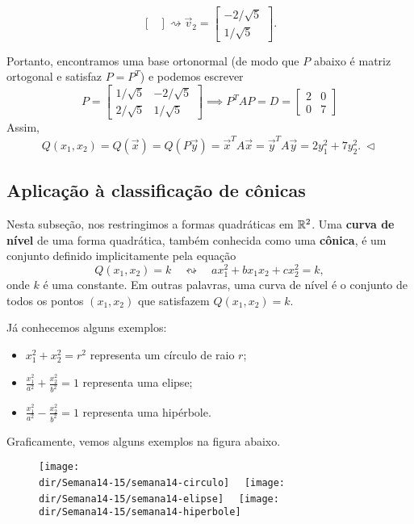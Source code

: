 \documentclass[../livro.tex]{subfiles}
\providecommand{\dir}{..}  %
\begin{document}
\begin{example}
\begin{itemize}
\[\begin{bmatrix}
		\end{bmatrix} \rightsquigarrow
		\vec{v}_2 = \begin{bmatrix}
		-2/\sqrt{5} \\ 1/\sqrt{5}
		\end{bmatrix} .
		\]
	\end{itemize}  Portanto, encontramos uma base ortonormal (de modo que $P$ abaixo é matriz ortogonal e satisfaz $P = P^T$) e podemos escrever
	\[
	P = 
	\begin{bmatrix}
	1/\sqrt{5} & -2/\sqrt{5} \\ 
	2/\sqrt{5} & 1/\sqrt{5}
	\end{bmatrix} \implies P^T A P = D = 
	\begin{bmatrix}
	2 & 0 \\ 0 & 7
	\end{bmatrix}
	\] Assim, 
	\[
	Q(x_1, x_2) = Q (\vec{x}) = Q (P\vec{y}) = \vec{x}^T A \vec{x} = \vec{y}^T A \vec{y} =  2 y_1^2 + 7 y_2^2. \ \lhd
	\]
\end{example}



\subsection{Aplicação à classificação de cônicas}

Nesta subseção, nos restringimos a formas quadráticas em $\mathbb{R}^2$. Uma \textbf{curva de nível} de uma forma quadrática, também conhecida como uma \textbf{cônica}, é um conjunto definido implicitamente pela equação
\[
Q(x_1, x_2) = k \quad \leftrightsquigarrow \quad ax_1^2 + bx_1x_2 + cx_2^2 = k,
\] onde $k$ é uma constante. Em outras palavras, uma curva de nível é o conjunto de todos os pontos $(x_1, x_2)$ que satisfazem $Q(x_1, x_2) = k$.

Já conhecemos alguns exemplos:
\begin{itemize}
	\item $x_1^2 + x_2^2 = r^2$ representa um círculo de raio $r$;
	\item $\frac{x_1^2}{a^2} + \frac{x_2^2}{b^2} = 1$ representa uma elipse;
	\item $\frac{x_1^2}{a^2} - \frac{x_2^2}{b^2} = 1$ representa uma hipérbole.
\end{itemize} Graficamente, vemos alguns exemplos na figura abaixo.
\begin{figure}[h!]
	\begin{center}
		\texttt{[image: \\dir/Semana14-15/semana14-circulo]} \ \ \texttt{[image: \\dir/Semana14-15/semana14-elipse]} \ \ \texttt{[image: \\dir/Semana14-15/semana14-hiperbole]}
	\end{center}
\end{figure}
\end{document}
